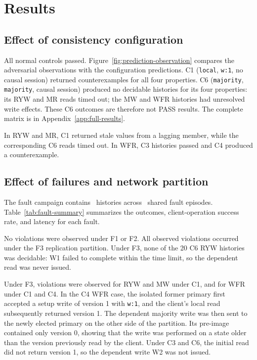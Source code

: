 \section{Results}

\subsection{Effect of consistency configuration}

All normal controls passed. Figure~\ref{fig:prediction-observation} compares
the adversarial observations with the configuration predictions. C1
(\texttt{local}, \texttt{w:1}, no causal session) returned counterexamples for
all four properties. C6 (\texttt{majority}, \texttt{majority}, causal session)
produced no decidable histories for its four properties: its RYW and MR reads
timed out; the MW and WFR histories had unresolved write effects. These C6
outcomes are therefore not PASS results.
The complete matrix is in Appendix~\ref{app:full-results}.

\FloatBarrier

In RYW and MR, C1 returned stale values from a lagging member, while the
corresponding C6 reads timed out. In WFR, C3 histories passed and C4 produced a
counterexample.

\subsection{Effect of failures and network partition}

The fault campaign contains \RQTwoHistoryCount\ histories across
\RQTwoFaultEpisodeCount\ shared fault episodes. Table~\ref{tab:fault-summary}
summarizes the outcomes, client-operation success rate, and latency for each
fault.

No violations were observed under F1 or F2. All observed violations occurred
under the F3 replication partition. Under F3, none of the 20 C6 RYW histories
was decidable: W1 failed to complete within the time limit, so the dependent
read was never issued.

Under F3, violations were observed for RYW and MW under C1, and for WFR under
C1 and C4. In the C4 WFR case, the isolated former primary first accepted a
setup write of version 1 with \texttt{w:1}, and the client's local read
subsequently returned version 1. The dependent majority write was then sent to
the newly elected primary on the other side of the partition. Its pre-image
contained only version 0, showing that the write was performed on a state older
than the version previously read by the client. Under C3 and C6, the initial
read did not return version 1, so the dependent write W2 was not issued.

